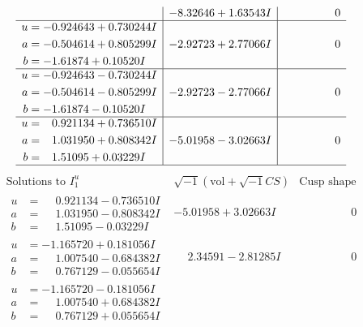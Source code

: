 \documentclass[1p]{elsarticle_modified}
\theoremstyle{definition}
\newcommand{\I}{\sqrt{-1}}
\begin{document}
$$\begin{array}{c|c|c}
 & -8.32646 + 1.63543 I & \phantom{-0.000000 } 0 \\ \hline\begin{aligned}
u &= -0.924643 + 0.730244 I \\
a &= -0.504614 + 0.805299 I \\
b &= -1.61874 + 0.10520 I\end{aligned}
 & -2.92723 + 2.77066 I & \phantom{-0.000000 } 0 \\ \hline\begin{aligned}
u &= -0.924643 - 0.730244 I \\
a &= -0.504614 - 0.805299 I \\
b &= -1.61874 - 0.10520 I\end{aligned}
 & -2.92723 - 2.77066 I & \phantom{-0.000000 } 0 \\ \hline\begin{aligned}
u &= \phantom{-}0.921134 + 0.736510 I \\
a &= \phantom{-}1.031950 + 0.808342 I \\
b &= \phantom{-}1.51095 + 0.03229 I\end{aligned}
 & -5.01958 - 3.02663 I & \phantom{-0.000000 } 0\\
 \hline 
 \end{array}$$\newpage$$\begin{array}{c|c|c}  
\text{Solutions to }I^u_{1}& \I (\text{vol} + \sqrt{-1}CS) & \text{Cusp shape}\\
 \hline 
\begin{aligned}
u &= \phantom{-}0.921134 - 0.736510 I \\
a &= \phantom{-}1.031950 - 0.808342 I \\
b &= \phantom{-}1.51095 - 0.03229 I\end{aligned}
 & -5.01958 + 3.02663 I & \phantom{-0.000000 } 0 \\ \hline\begin{aligned}
u &= -1.165720 + 0.181056 I \\
a &= \phantom{-}1.007540 - 0.684382 I \\
b &= \phantom{-}0.767129 - 0.055654 I\end{aligned}
 & \phantom{-}2.34591 - 2.81285 I & \phantom{-0.000000 } 0 \\ \hline\begin{aligned}
u &= -1.165720 - 0.181056 I \\
a &= \phantom{-}1.007540 + 0.684382 I \\
b &= \phantom{-}0.767129 + 0.055654 I\end{aligned}

\end{array}$$
\end{document}
